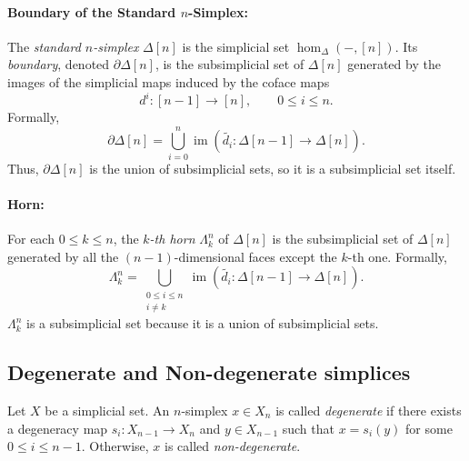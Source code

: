 \documentclass[11pt]{article}
\theoremstyle{definition}
\theoremstyle{plain}
\begin{document}
\paragraph{\textbf{Boundary of the Standard $n$-Simplex:}}
The \emph{standard $n$-simplex} $\Delta[n]$ is the simplicial set $\hom_\Delta(-,[n])$.
Its \emph{boundary}, denoted $\partial \Delta[n]$, is the subsimplicial set of $\Delta[n]$ generated by the images of the simplicial maps induced by the coface maps
\[
    d^i : [n-1] \to [n], \qquad 0 \leq i \leq n.
\]
Formally,
\[
    \partial \Delta[n] = \bigcup_{i=0}^n \operatorname{im}(\tilde{d_i} : \Delta[n-1] \to \Delta[n]).
\]
Thus, $\partial \Delta[n]$ is the union of subsimplicial sets, so it is a subsimplicial set itself.
\paragraph{\textbf{Horn:}}
For each $0 \leq k \leq n$, the \emph{$k$-th horn} $\Lambda^n_k$ of $\Delta[n]$ is the subsimplicial set of $\Delta[n]$ generated by all the $(n-1)$-dimensional faces except the $k$-th one.
Formally,
\[
    \Lambda^n_k = \bigcup_{\substack{0 \leq i \leq n \\ i \neq k}} \operatorname{im}(\tilde{d_i} : \Delta[n-1] \to \Delta[n]).
\]
$\Lambda^n_k$ is a subsimplicial set because it is a union of subsimplicial sets.


\subsection{Degenerate and Non-degenerate simplices}

Let $X$ be a simplicial set. An $n$-simplex $x \in X_n$ is called \emph{degenerate} if there exists a degeneracy map $s_i : X_{n-1} \to X_n$ and $y \in X_{n-1}$ such that $x = s_i(y)$ for some $0 \leq i \leq n-1$. Otherwise, $x$ is called \emph{non-degenerate}.
\end{document}
